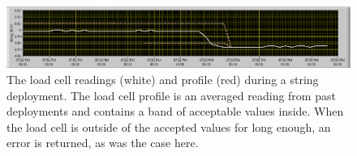 \begin{figure}
    \centering
    \includegraphics[width=0.8\linewidth]{Figures/LoadCellProfile.png}
    \caption[The load cell readings and profile during a string deployment]
    {The load cell readings (white) and profile (red) during a string deployment.
    The load cell profile is an averaged reading from past deployments and contains a band of acceptable values inside.
    When the load cell is outside of the accepted values for long enough, an error is returned, as was the case here.}
    \label{fig:load_cell_profile}
\end{figure}

